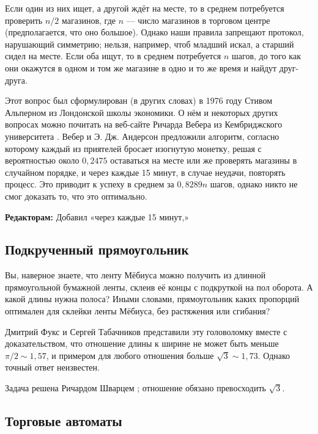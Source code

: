 \medskip

Если один из них ищет, а другой ждёт на месте, то в среднем потребуется проверить $n/2$ магазинов, где $n$ --- число магазинов в торговом центре (предполагается, что оно большое).
Однако наши правила запрещают протокол, нарушающий симметрию;
нельзя, например, чтоб младший искал, а старший сидел на месте.
Если оба ищут, то в среднем потребуется $n$ шагов, до того как они окажутся в одном и том же магазине в одно и то же время и найдут друг-друга.

Этот вопрос был сформулирован (в других словах) в 1976 году Стивом Альперном из Лондонской школы экономики.
О нём и некоторых других вопросах можно почитать на веб-сайте Ричарда Вебера из Кембриджского университета \cite{weber}.
Вебер и Э. Дж. Андерсон предложили алгоритм, согласно которому каждый из приятелей бросает изогнутую монетку, решая с вероятностью около $0{,}2475$ оставаться на месте или же проверять магазины в случайном порядке,
и через каждые 15 минут, в случае неудачи, повторять процесс.
Это приводит к успеху в среднем за $0{,}8289n$ шагов, однако никто не смог доказать то, что это оптимально.

\begin{addedbytheeditors}
\textbf{Редакторам:} Добавил «через каждые 15 минут,»
\end{addedbytheeditors}


\subsection*{Подкрученный прямоугольник}

Вы, наверное знаете, что ленту Мёбиуса можно получить из длинной прямоугольной бумажной ленты,
склеив её концы с подкруткой на пол оборота.
А какой длины нужна полоса?
Иными словами, прямоугольник каких пропорций оптимален для склейки ленты Мёбиуса, без растяжения или сгибания?

Дмитрий Фукс и Сергей Табачников представили эту головоломку \cite[Лекция 14]{19} вместе с доказательством, что отношение длины к ширине не может быть меньше $\pi/2 \sim 1{,}57$, и примером для любого отношения больше $\sqrt{3} \sim 1{,}73$.
Однако точный ответ неизвестен.

\begin{addedbytheeditors}
Задача решена Ричардом Шварцем \cite{schwartz}; отношение обязано превосходить $\sqrt{3}$.
\end{addedbytheeditors}


\subsection*{Торговые автоматы}

